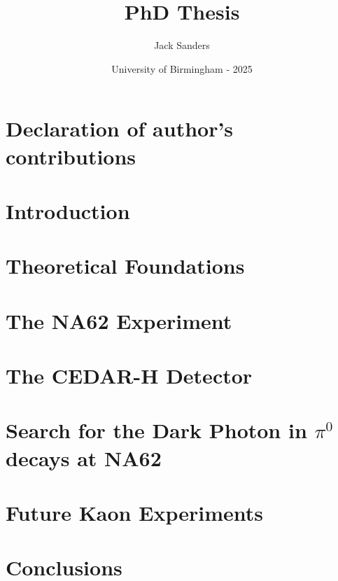 \documentclass[12pt]{report}
\title{PhD Thesis}
\author{Jack Sanders }
\date{University of Birmingham - 2025}
\numberwithin{equation}{chapter}
\begin{document}

\fancyhead[L]{}
\fancyhead[R]{\rightmark}

\newpage

\chapter*{Declaration of author's contributions}




\tableofcontents
\newpage
\printglossary[type=\acronymtype, title={List of Acronyms}]
\newpage
\listoffigures
\newpage
\listoftables
\newpage

\chapter*{Introduction}

\chapter{Theoretical Foundations}\label{sec:theory}
\fancyhead[L]{\thesection\quad\leftmark}
\fancyhead[R]{\rightmark}

\chapter{The NA62 Experiment}\label{sec:na62}


\chapter{The CEDAR-H Detector}\label{sec:cedarH}


%

\chapter[Dark Photon in $\pi^0$ decays]{Search for the Dark Photon in \boldmath $\pi^0$ \unboldmath decays at NA62}\label{sec:darkP}


\chapter{Future Kaon Experiments}\label{chap:FutureKaon}


\chapter{Conclusions}



\renewcommand{\bibname}{References}
\cleardoublepage
{}
{}


\end{document}
